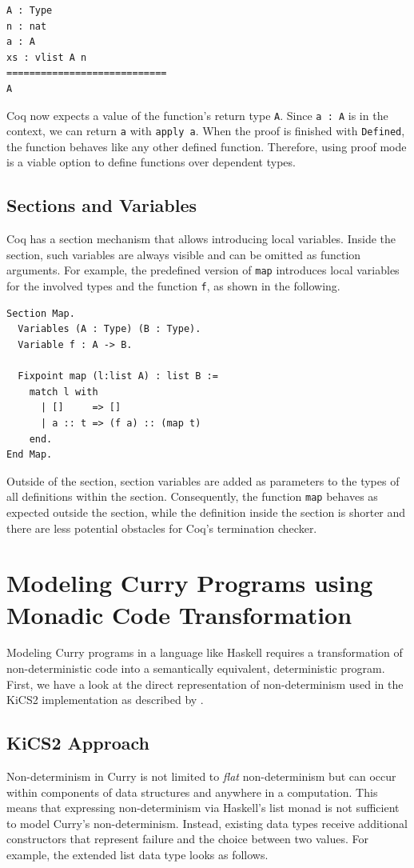 \documentclass[a4paper, 11pt, fleqn, twoside, abstract=on]{scrreprt}
\newcommand{\cinl}[1]{\texttt{#1}}
\begin{document}
\begin{verbatim}
A : Type
n : nat
a : A
xs : vlist A n
============================
A
\end{verbatim}

Coq now expects a value of the function's return type \cinl{A}.
Since \cinl{a : A} is in the context, we can return \cinl{a} with \cinl{apply a}.
When the proof is finished with \cinl{Defined}, the function behaves like any other defined function.
Therefore, using proof mode is a viable option to define functions over dependent types.

\subsection{Sections and Variables}
Coq has a section mechanism that allows introducing local variables.
Inside the section, such variables are always visible and can be omitted as function arguments.
For example, the predefined version of \cinl{map} introduces local variables for the involved types and the function \cinl{f}, as shown in the following.

\begin{verbatim}
Section Map.
  Variables (A : Type) (B : Type).
  Variable f : A -> B.

  Fixpoint map (l:list A) : list B :=
    match l with
      | []     => []
      | a :: t => (f a) :: (map t)
    end.
End Map.
\end{verbatim}

Outside of the section, section variables are added as parameters to the types of all definitions within the section.
Consequently, the function \cinl{map} behaves as expected outside the section, while the definition inside the section is shorter and there are less potential obstacles for Coq's termination checker.

\section{Modeling Curry Programs using Monadic Code Transformation}

Modeling Curry programs in a language like Haskell requires a transformation of non-deterministic code into a semantically equivalent, deterministic program.
First, we have a look at the direct representation of non-determinism used in the KiCS2 implementation as described by \citet{brassel2011kics2}.

\subsection{KiCS2 Approach}
\label{subsec:kics2}
Non-determinism in Curry is not limited to \textit{flat} non-determinism but can occur within components of data structures and anywhere in a computation.
This means that expressing non-determinism via Haskell's list monad is not sufficient to model Curry's non-determinism.
Instead, existing data types receive additional constructors that represent failure and the choice between two values.
For example, the extended list data type looks as follows.
\end{document}
